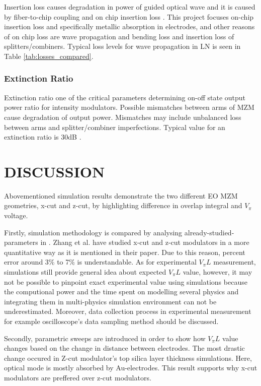 \documentclass[thesis]{deutez}
\begin{document}
    Insertion loss causes degradation in power of guided optical wave and it is caused by fiber-to-chip coupling and on chip insertion loss \cite{1}. This project focuses  on-chip insertion loss and specifically metallic absorption in electrodes, and other reasons of on chip loss are wave propagation and bending loss and insertion loss of splitters/combiners. Typical loss levels for wave propagation in LN is seen in Table \ref{tab:losses_compared}.
    
    \subsection{Extinction Ratio}

    Extinction ratio one of the critical parameters determining on-off state output power ratio for intensity modulators. Possible mismatches between arms of MZM cause degradation of output power. Mismatches may include unbalanced loss between arms and splitter/combiner imperfections. Typical value for an extinction ratio is 30dB \cite{14}.



    
    
\chapter{DISCUSSION}

    Abovementioned simulation results demonstrate the two different EO MZM geometries, x-cut and z-cut, by highlighting difference in overlap integral and $V_\pi$ voltage. 

    Firstly, simulation methodology is compared by analysing already-studied-parameters in \cite{21}. Zhang et al. have studied x-cut and z-cut modulators in a more quantitative way as it is mentioned in their paper. Due to this reason, percent error around 3\% to 7\% is understandable. As for experimental $V_\pi L$ measurement, simulations still provide general idea about expected $V_\pi L$ value, however, it may not be possible to pinpoint exact experimental value using simulations because the computional power and the time spent on modelling several physics and integrating them in multi-physics simulation environment can not be underestimated. Moreover, data collection process in experimental measurement for example oscilloscope's data sampling method should be discussed. 

    Secondly, parametric sweeps are introduced in order to show how $V_\pi L$ value changes based on the change in distance between electrodes. The most drastic change occured in Z-cut modulator's top silica layer thickness simulations. Here, optical mode is mostly absorbed by Au-electrodes. This result supports why x-cut modulators are preffered over z-cut modulators. 
     
\end{document}
